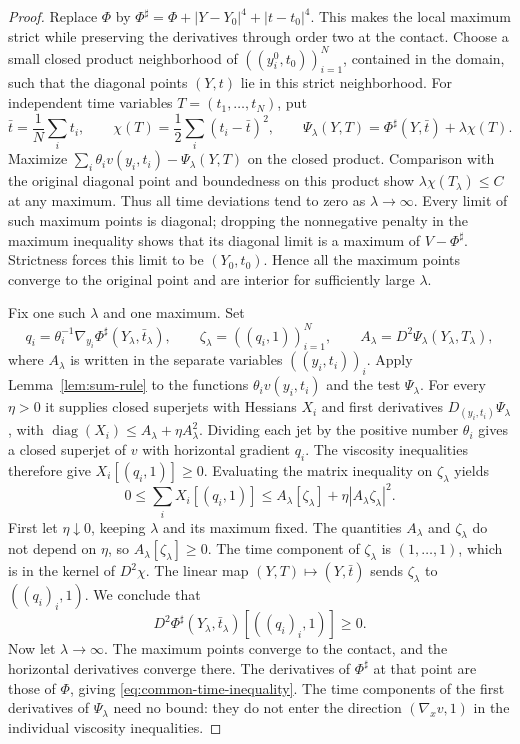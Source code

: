 \begin{proof}
Replace $\Phi$ by
$\Phi^\sharp=\Phi+|Y-Y_0|^4+|t-t_0|^4$. This makes the local
maximum strict while preserving the derivatives through order
two at the contact. Choose a small closed product neighborhood
of $((y_i^0,t_0))_{i=1}^N$, contained in the domain, such that
the diagonal points $(Y,t)$ lie in this strict neighborhood.
For independent time variables $T=(t_1,\ldots,t_N)$, put
\[
  \bar t=\frac1N\sum_i t_i,\qquad
  \chi(T)=\frac12\sum_i(t_i-\bar t)^2,\qquad
  \Psi_\lambda(Y,T)=\Phi^\sharp(Y,\bar t)+\lambda\chi(T).
\]
Maximize
$\sum_i\theta_i v(y_i,t_i)-\Psi_\lambda(Y,T)$ on the closed
product. Comparison with the original diagonal point and
boundedness on this product show
$\lambda\chi(T_\lambda)\le C$ at any maximum. Thus all
time deviations tend to zero as $\lambda\to\infty$. Every
limit of such maximum points is diagonal; dropping the
nonnegative penalty in the maximum inequality shows that its
diagonal limit is a maximum of $V-\Phi^\sharp$. Strictness
forces this limit to be $(Y_0,t_0)$. Hence all the maximum
points converge to the original point and are interior for
sufficiently large $\lambda$.

Fix one such $\lambda$ and one maximum. Set
\[
  q_i=\theta_i^{-1}\nabla_{y_i}
             \Phi^\sharp(Y_\lambda,\bar t_\lambda),
  \qquad
  \zeta_\lambda=((q_i,1))_{i=1}^N,\qquad
  A_\lambda=D^2\Psi_\lambda(Y_\lambda,T_\lambda),
\]
where $A_\lambda$ is written in the separate variables
$((y_i,t_i))_i$. Apply Lemma~\ref{lem:sum-rule} to the
functions $\theta_i v(y_i,t_i)$ and the test $\Psi_\lambda$.
For every $\eta>0$ it supplies closed superjets with Hessians
$X_i$ and first derivatives $D_{(y_i,t_i)}\Psi_\lambda$, with
$\operatorname{diag}(X_i)\le A_\lambda+\eta A_\lambda^2$.
Dividing each jet by the positive number $\theta_i$ gives a
closed superjet of $v$ with horizontal gradient $q_i$.
The viscosity inequalities therefore give
$X_i[(q_i,1)]\ge0$. Evaluating the matrix inequality on
$\zeta_\lambda$ yields
\[
  0\le\sum_iX_i[(q_i,1)]
     \le A_\lambda[\zeta_\lambda]
                   +\eta|A_\lambda\zeta_\lambda|^2.
\]
First let $\eta\downarrow0$, keeping $\lambda$ and its maximum
fixed. The quantities $A_\lambda$ and $\zeta_\lambda$ do not
depend on $\eta$, so $A_\lambda[\zeta_\lambda]\ge0$.
The time component of $\zeta_\lambda$ is $(1,\ldots,1)$,
which is in the kernel of $D^2\chi$. The linear map
$(Y,T)\mapsto(Y,\bar t)$ sends $\zeta_\lambda$ to
$((q_i)_i,1)$. We conclude that
\[
  D^2\Phi^\sharp(Y_\lambda,\bar t_\lambda)
       [((q_i)_i,1)]\ge0.
\]
Now let $\lambda\to\infty$. The maximum points converge to the
contact, and the horizontal derivatives converge there.
The derivatives of $\Phi^\sharp$ at that point are those of
$\Phi$, giving \eqref{eq:common-time-inequality}.
The time components of the first derivatives of
$\Psi_\lambda$ need no bound: they do not enter the direction
$(\nabla_xv,1)$ in the individual viscosity inequalities.
\end{proof}

